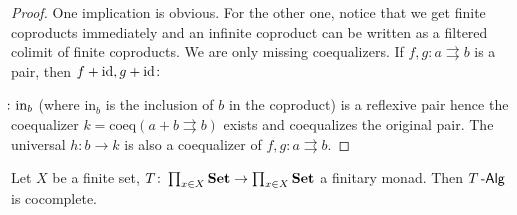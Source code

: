 \documentclass[a4paper,11pt,oneside,openany]{scrbook}
\begin{document}
\begin{proof}
One implication is obvious. For the other one, notice that we get finite coproducts immediately and an infinite coproduct can be written as a filtered colimit of finite coproducts. We are only missing coequalizers. If $f,g\colon a\rightrightarrows b$ is a pair, then $f+\operatorname{id},g+\operatorname{id}\colon\hspace{-1.5mm}$$\hspace{-1.5mm}\colon\text{in}_b$ (where in$_b$ is the inclusion of $b$ in the coproduct) is a reflexive pair hence the coequalizer $k=\text{coeq}(a+b\rightrightarrows b)$ exists and coequalizes the original pair. The universal $h\colon b\rightarrow k$ is also a coequalizer of $f,g\colon a\rightrightarrows b$.
\end{proof}
\begin{thm}
Let $X$ be a finite set, $T\colon\prod_{x\in X}{\normalfont\textbf{Set}}\to\prod_{x\in X}{\normalfont\textbf{Set}}$ a finitary monad. Then $T\operatorname{-\mathsf{Alg}}$ is cocomplete.
\end{thm}
\end{document}
